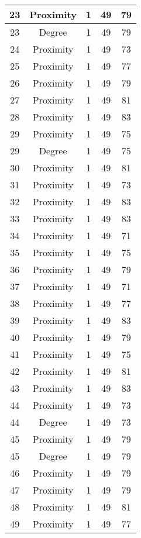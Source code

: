 \documentclass[results.tex]{subfiles}
\begin{document}
\begin{center}
\begin{tabular}{| c || c | c | c | c |}
    \hline
    23 & Proximity & 1 & 49 & 79 \\ 
    \hline
    23 & Degree & 1 & 49 & 79 \\ 
    \hline
    24 & Proximity & 1 & 49 & 73 \\ 
    \hline
    25 & Proximity & 1 & 49 & 77 \\ 
    \hline
    26 & Proximity & 1 & 49 & 79 \\ 
    \hline
    27 & Proximity & 1 & 49 & 81 \\ 
    \hline
    28 & Proximity & 1 & 49 & 83 \\ 
    \hline
    29 & Proximity & 1 & 49 & 75 \\ 
    \hline
    29 & Degree & 1 & 49 & 75 \\ 
    \hline
    30 & Proximity & 1 & 49 & 81 \\ 
    \hline
    31 & Proximity & 1 & 49 & 73 \\ 
    \hline
    32 & Proximity & 1 & 49 & 83 \\ 
    \hline
    33 & Proximity & 1 & 49 & 83 \\ 
    \hline
    34 & Proximity & 1 & 49 & 71 \\ 
    \hline
    35 & Proximity & 1 & 49 & 75 \\ 
    \hline
    36 & Proximity & 1 & 49 & 79 \\ 
    \hline
    37 & Proximity & 1 & 49 & 71 \\ 
    \hline
    38 & Proximity & 1 & 49 & 77 \\ 
    \hline
    39 & Proximity & 1 & 49 & 83 \\ 
    \hline
    40 & Proximity & 1 & 49 & 79 \\ 
    \hline
    41 & Proximity & 1 & 49 & 75 \\ 
    \hline
    42 & Proximity & 1 & 49 & 81 \\ 
    \hline
    43 & Proximity & 1 & 49 & 83 \\ 
    \hline
    44 & Proximity & 1 & 49 & 73 \\ 
    \hline
    44 & Degree & 1 & 49 & 73 \\ 
    \hline
    45 & Proximity & 1 & 49 & 79 \\ 
    \hline
    45 & Degree & 1 & 49 & 79 \\ 
    \hline
    46 & Proximity & 1 & 49 & 79 \\ 
    \hline
    47 & Proximity & 1 & 49 & 79 \\ 
    \hline
    48 & Proximity & 1 & 49 & 81 \\ 
    \hline
    49 & Proximity & 1 & 49 & 77 \\ 
    \hline   \end{tabular}
\end{center}
\end{document}

